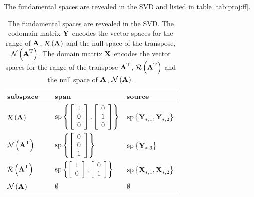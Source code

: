 The fundamental spaces are revealed in the SVD and listed in table \eqref{tab:proj:ff}.
\begin{table}[htdp]
\begin{center}
\begin{tabular}{lll}
 subspace & \qquad \qquad span & source\\\hline
 $\rng{\A{}}$  & $\spn\lst{\mat{c}{1\\0\\0},\mat{c}{0\\1\\0}}$ \qquad & $\spn\lst{\Y{}_{*,1},\Y{}_{*,2}}$\\[19pt]\hline
 $\nll{\A{T}}$ & $\spn\lst{\mat{c}{0\\0\\1}}$ & $\spn\lst{\Y{}_{*,3}}$ \\[19pt]\hline
 $\rng{\A{T}}\qquad $ & $\spn\lst{\mat{c}{1\\0},\mat{c}{0\\1}}$ & $\spn\lst{\X{}_{*,1},\X{}_{*,2}}$\\[13pt]\hline
 $\nll{\A{}}$  & \qquad \qquad  $\emptyset$ & \quad  \quad $\emptyset$\\[2pt]\hline
\end{tabular}
\end{center}
\label{tab:proj:ff}
\caption{The fundamental spaces are revealed in the SVD. The codomain matrix $\Y{}$ encodes the vector spaces for the range of $\A{}$, $\rng{\A{}}$ and  the null space of the transpose, $\nll{\A{T}}$. The domain matrix $\X{}$ encodes the vector spaces for the range of the transpose $\A{T}$, $\rng{\A{T}}$ and  the null space of $\A{}$, $\nll{\A{}}$.}
\end{table}%

